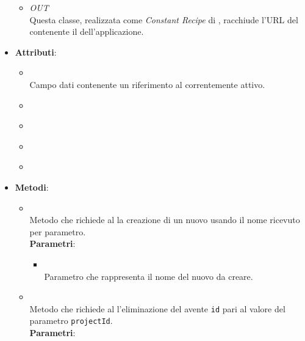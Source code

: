 \begin{itemize}
\begin{itemize}
\item \textit{OUT} \hyperref[\nogloxy{Premi::Front-End::Services::ServerURL}]{}\\
Questa classe, realizzata come \textit{Constant Recipe} di , racchiude l'URL del  contenente il  dell'applicazione.
\end{itemize}
\item \textbf{Attributi}:
\begin{itemize}
\item {}
\\ Campo dati contenente un riferimento al  correntemente attivo.
\item {}
\\ \dpMindMapServiceField
\item {}
\\ \dpConstantServiceField
\item {}
\\ \dpHttpField
\item {}
\\ \dpQField
\end{itemize}
\item \textbf{Metodi}:
\begin{itemize}
\item {}
\\ Metodo che richiede al  la creazione di un nuovo  usando il nome ricevuto per parametro. 
\\ \textbf{Parametri}:
\begin{itemize}
\item {}
\\ Parametro che rappresenta il nome del nuovo  da creare.
\end{itemize}
\item {}
\\ Metodo che richiede al  l'eliminazione del  avente \texttt{id} pari al valore del parametro \texttt{projectId}. \dpReturnPromiseNoValue
\\ \textbf{Parametri}:

\end{itemize}
\end{itemize}
